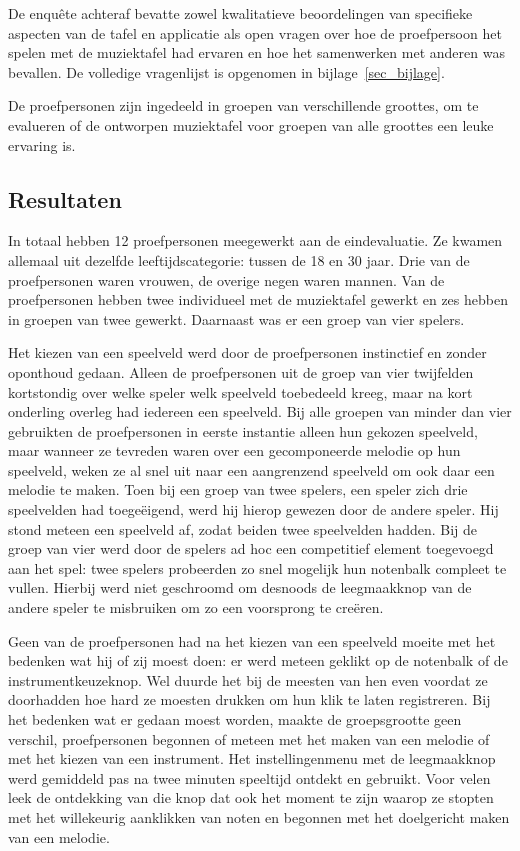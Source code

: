 \documentclass{acm}
\begin{document}
De enqu\^ete achteraf bevatte zowel kwalitatieve beoordelingen van specifieke aspecten van de tafel en applicatie als open vragen over hoe de proefpersoon het spelen met de muziektafel had ervaren en hoe het samenwerken met anderen was bevallen. De volledige vragenlijst is opgenomen in bijlage~\ref{sec_bijlage}.

De proefpersonen zijn ingedeeld in groepen van verschillende groottes, om te evalueren of de ontworpen muziektafel voor groepen van alle groottes een leuke ervaring is.

\subsection{Resultaten}
In totaal hebben 12 proefpersonen meegewerkt aan de eindevaluatie. Ze kwamen allemaal uit dezelfde leeftijdscategorie: tussen de 18 en 30 jaar. Drie van de proefpersonen waren vrouwen, de overige negen waren mannen. Van de proefpersonen hebben twee individueel met de muziektafel gewerkt en zes hebben in groepen van twee gewerkt. Daarnaast was er een groep van vier spelers.

Het kiezen van een speelveld werd door de proefpersonen instinctief en zonder oponthoud gedaan. Alleen de proefpersonen uit de groep van vier twijfelden kortstondig over welke speler welk speelveld toebedeeld kreeg, maar na kort onderling overleg had iedereen een speelveld. Bij alle groepen van minder dan vier gebruikten de proefpersonen in eerste instantie alleen hun gekozen speelveld, maar wanneer ze tevreden waren over een gecomponeerde melodie op hun speelveld, weken ze al snel uit naar een aangrenzend speelveld om ook daar een melodie te maken. Toen bij een groep van twee spelers, een speler zich drie speelvelden had toege\"eigend, werd hij hierop gewezen door de andere speler. Hij stond meteen een speelveld af, zodat beiden twee speelvelden hadden. Bij de groep van vier werd door de spelers ad hoc een competitief element toegevoegd aan het spel: twee spelers probeerden zo snel mogelijk hun notenbalk compleet te vullen. Hierbij werd niet geschroomd om desnoods de leegmaakknop van de andere speler te misbruiken om zo een voorsprong te cre\"eren.

Geen van de proefpersonen had na het kiezen van een speelveld moeite met het bedenken wat hij of zij moest doen: er werd meteen geklikt op de notenbalk of de instrumentkeuzeknop. Wel duurde het bij de meesten van hen even voordat ze doorhadden hoe hard ze moesten drukken om hun klik te laten registreren. Bij het bedenken wat er gedaan moest worden, maakte de groepsgrootte geen verschil, proefpersonen begonnen of meteen met het maken van een melodie of met het kiezen van een instrument. Het instellingenmenu met de leegmaakknop werd gemiddeld pas na twee minuten speeltijd ontdekt en gebruikt. Voor velen leek de ontdekking van die knop dat ook het moment te zijn waarop ze stopten met het willekeurig aanklikken van noten en begonnen met het doelgericht maken van een melodie.
\end{document}
